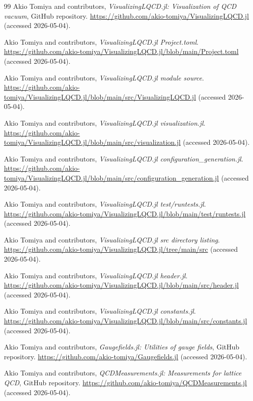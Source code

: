 \documentclass[uplatex,dvipdfmx,ja=standard,11pt,a4paper]{bxjsarticle}
\begin{document}
\begin{thebibliography}{99}
Akio Tomiya and contributors,
\textit{VisualizingLQCD.jl: Visualization of QCD vacuum}, GitHub repository.
\url{https://github.com/akio-tomiya/VisualizingLQCD.jl} (accessed 2026-05-04).

Akio Tomiya and contributors,
\textit{VisualizingLQCD.jl Project.toml}.
\url{https://github.com/akio-tomiya/VisualizingLQCD.jl/blob/main/Project.toml} (accessed 2026-05-04).

Akio Tomiya and contributors,
\textit{VisualizingLQCD.jl module source}.
\url{https://github.com/akio-tomiya/VisualizingLQCD.jl/blob/main/src/VisualizingLQCD.jl} (accessed 2026-05-04).

Akio Tomiya and contributors,
\textit{VisualizingLQCD.jl visualization.jl}.
\url{https://github.com/akio-tomiya/VisualizingLQCD.jl/blob/main/src/visualization.jl} (accessed 2026-05-04).

Akio Tomiya and contributors,
\textit{VisualizingLQCD.jl configuration\_generation.jl}.
\url{https://github.com/akio-tomiya/VisualizingLQCD.jl/blob/main/src/configuration_generation.jl} (accessed 2026-05-04).

Akio Tomiya and contributors,
\textit{VisualizingLQCD.jl test/runtests.jl}.
\url{https://github.com/akio-tomiya/VisualizingLQCD.jl/blob/main/test/runtests.jl} (accessed 2026-05-04).


Akio Tomiya and contributors,
\textit{VisualizingLQCD.jl src directory listing}.
\url{https://github.com/akio-tomiya/VisualizingLQCD.jl/tree/main/src} (accessed 2026-05-04).

Akio Tomiya and contributors,
\textit{VisualizingLQCD.jl header.jl}.
\url{https://github.com/akio-tomiya/VisualizingLQCD.jl/blob/main/src/header.jl} (accessed 2026-05-04).

Akio Tomiya and contributors,
\textit{VisualizingLQCD.jl constants.jl}.
\url{https://github.com/akio-tomiya/VisualizingLQCD.jl/blob/main/src/constants.jl} (accessed 2026-05-04).

Akio Tomiya and contributors,
\textit{Gaugefields.jl: Utilities of gauge fields}, GitHub repository.
\url{https://github.com/akio-tomiya/Gaugefields.jl} (accessed 2026-05-04).

Akio Tomiya and contributors,
\textit{QCDMeasurements.jl: Measurements for lattice QCD}, GitHub repository.
\url{https://github.com/akio-tomiya/QCDMeasurements.jl} (accessed 2026-05-04).


\end{thebibliography}
\end{document}
